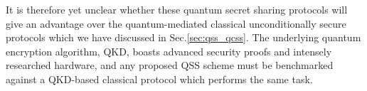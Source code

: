 It is therefore yet unclear whether these quantum secret sharing protocols will give an advantage over the quantum-mediated classical unconditionally secure protocols which we have discussed in Sec.\ref{sec:qss_qcss}. The underlying quantum encryption algorithm, QKD, boasts advanced security proofs and intensely researched hardware, and any proposed QSS scheme must be benchmarked against a QKD-based classical protocol which performs the same task.